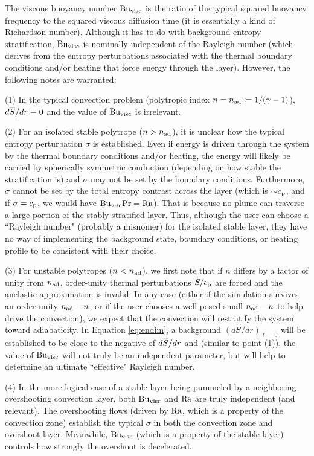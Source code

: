 \documentclass[12pt]{article}
\numberwithin{equation}{section}
\newcommand{\nad}{n_{\rm{ad}}}
\begin{document}
The viscous buoyancy number ${\rm{Bu_{visc}}}$ is the ratio of the typical squared buoyancy frequency to the squared viscous diffusion time (it is essentially a kind of Richardson number). Although it has to do with background entropy stratification, ${\rm{Bu_{visc}}}$ is nominally independent of the Rayleigh number (which derives from the entropy perturbations associated with the thermal boundary conditions and/or heating that force energy through the layer). However, the following notes are warranted: 

(1) In the typical convection problem (polytropic index $n=\nad\define1/(\gamma-1)$), $d\overline{S}/dr\equiv0$ and the value of ${\rm{Bu_{visc}}}$ is irrelevant. 

(2) For an isolated stable polytrope ($n>\nad$), it is unclear how the typical entropy perturbation $\sigma$ is established. Even if energy is driven through the system by the thermal boundary conditions and/or heating, the energy will likely be carried by spherically symmetric conduction (depending on how stable the stratification is) and $\sigma$ may not be set by the boundary conditions. Furthermore, $\sigma$ cannot be set by the total entropy contrast across the layer (which is $\sim$$c_{\rm{p}}$, and if $\sigma=c_{\rm{p}}$, we would have ${\rm{Bu_{visc}}}{\rm{Pr}} = {\rm{Ra}}$). That is because no plume can traverse a large portion of the stably stratified layer. Thus, although the user can choose a ``Rayleigh number" (probably a misnomer) for the isolated stable layer, they have no way of implementing the background state, boundary conditions, or heating profile to be consistent with their choice. 

(3) For unstable polytropes ($n<\nad$), we first note that if $n$ differs by a factor of unity from $\nad$, order-unity thermal perturbations $S/c_{\rm{p}}$ are forced and the anelastic approximation is invalid. In any case (either if the simulation survives an order-unity $\nad-n$, or if the user chooses  a well-posed small $\nad-n$ to help drive the convection), we expect that the convection will restratify the system toward adiabaticity. In Equation \eqref{eq:endim}, a background $(dS/dr)_{\ell=0}$ will be established to be close to the negative of $d\overline{S}/dr$ and (similar to point (1)), the value of ${\rm{Bu_{visc}}}$ will not truly be an independent parameter, but will help to determine an ultimate ``effective" Rayleigh number. 

(4) In the more logical case of a stable layer being pummeled by a neighboring overshooting convection layer, both ${\rm{Bu_{visc}}}$ and ${\rm{Ra}}$ are truly independent (and relevant). The overshooting flows (driven by ${\rm{Ra}}$, which is a property of the convection zone) establish the typical $\sigma$ in both the convection zone and overshoot layer. Meanwhile, ${\rm{Bu_{visc}}}$ (which is a property of the stable layer) controls how strongly the overshoot is decelerated. 
\end{document}
